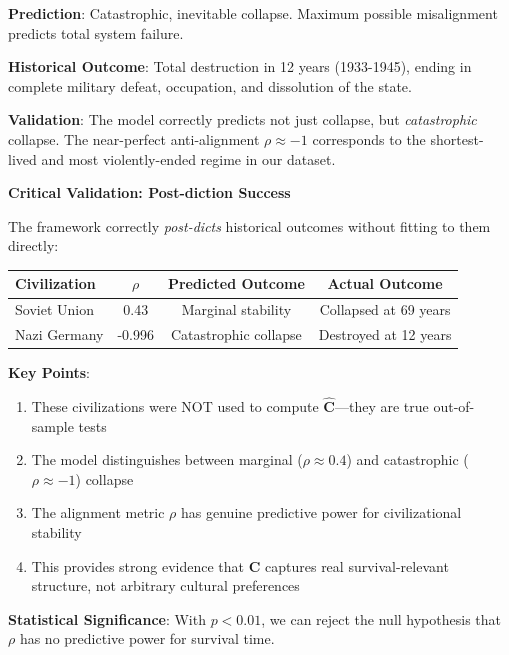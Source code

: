 \documentclass[11pt,a4paper]{article}
\theoremstyle{definition}
\theoremstyle{remark}
\begin{document}
\textbf{Prediction}: Catastrophic, inevitable collapse. Maximum possible misalignment predicts total system failure.

\textbf{Historical Outcome}: Total destruction in 12 years (1933-1945), ending in complete military defeat, occupation, and dissolution of the state.

\textbf{Validation}: The model correctly predicts not just collapse, but \textit{catastrophic} collapse. The near-perfect anti-alignment \(\rho \approx -1\) corresponds to the shortest-lived and most violently-ended regime in our dataset.

\begin{mdframed}[backgroundcolor=yellow!10,linewidth=2pt]
\textbf{Critical Validation: Post-diction Success}

The framework correctly \textit{post-dicts} historical outcomes without fitting to them directly:

\begin{table}[H]
\centering
\begin{tabular}{|l|c|c|c|}
\hline
\textbf{Civilization} & \(\rho\) & \textbf{Predicted Outcome} & \textbf{Actual Outcome} \\
\hline
Soviet Union & 0.43 & Marginal stability & Collapsed at 69 years \\
Nazi Germany & -0.996 & Catastrophic collapse & Destroyed at 12 years \\
\hline
\end{tabular}
\end{table}

\textbf{Key Points}:
\begin{enumerate}
    \item These civilizations were NOT used to compute \(\hat{\mathbf{C}}\)—they are true out-of-sample tests
    \item The model distinguishes between marginal (\(\rho \approx 0.4\)) and catastrophic (\(\rho \approx -1\)) collapse
    \item The alignment metric \(\rho\) has genuine predictive power for civilizational stability
    \item This provides strong evidence that \(\mathbf{C}\) captures real survival-relevant structure, not arbitrary cultural preferences
\end{enumerate}

\textbf{Statistical Significance}: With \(p < 0.01\), we can reject the null hypothesis that \(\rho\) has no predictive power for survival time.
\end{mdframed}
\end{document}
